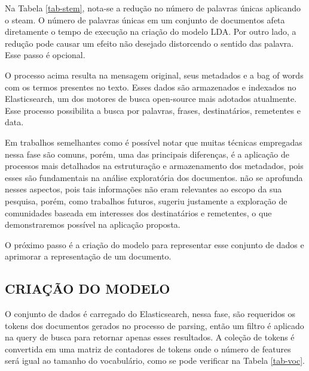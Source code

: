 \documentclass[12pt,a4paper]{article}
\begin{document}
\begin{enumerate}
Na Tabela \ref{tab-stem}, nota-se a redução no número de palavras únicas aplicando o steam. O número de palavras únicas em um conjunto de documentos afeta diretamente o tempo de execução na criação do modelo LDA.
 Por outro lado, a redução pode causar um efeito não desejado distorcendo o sentido das palavra. Esse passo é opcional.
\end{enumerate}


O processo acima resulta na mensagem original, seus metadados e a bag of words com os termos presentes no texto. Esses dados são armazenados e indexados no Elasticsearch,
 um dos motores de busca open-source mais adotados atualmente. Esse processo possibilita a busca por palavras, frases, destinatários, remetentes e data. 

Em trabalhos semelhantes como  é possível notar que muitas técnicas empregadas nessa fase são comuns, porém, uma das principais diferenças,
 é a aplicação de processos mais detalhados na estruturação e armazenamento dos metadados, pois esses são fundamentais na análise exploratória dos documentos.
  não se aprofunda nesses aspectos, pois tais informações não eram relevantes ao escopo da sua pesquisa,
 porém, como trabalhos futuros, sugeriu justamente a exploração de comunidades baseada em interesses dos destinatários e remetentes, o que demonstraremos possível na aplicação proposta.

O próximo passo é a criação do modelo para representar esse conjunto de dados e aprimorar a representação de um documento.



\subsection{CRIAÇÃO DO MODELO} \label{sec:criacao-modelo}
O conjunto de dados é carregado do Elasticsearch, nessa fase, são requeridos os tokens dos documentos gerados no processo de parsing, então
 um filtro é aplicado na query de busca para retornar apenas esses resultados. A coleção de tokens é convertida em uma matriz de contadores de tokens onde o número de features será igual ao tamanho do vocabulário, como se pode verificar na Tabela \ref{tab-voc}.
\end{document}
